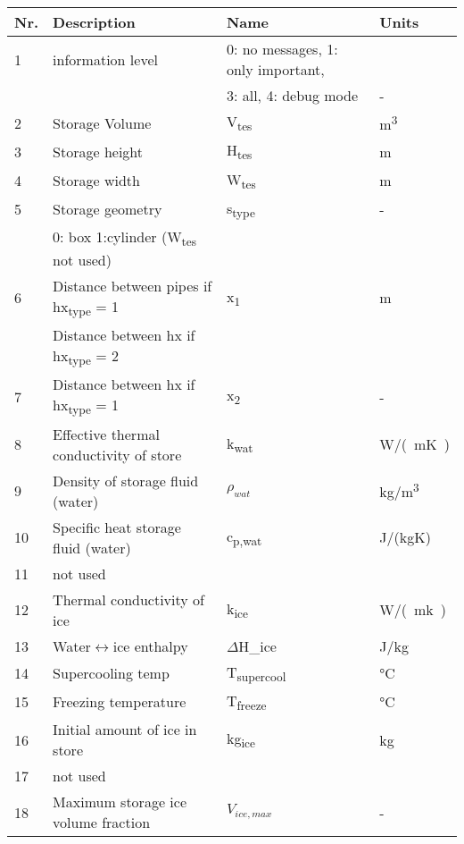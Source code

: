 \documentclass[english]{SPFReport}
\begin{document}
\def\arraystretch{1.3}
\begin{tabular}{| l |  m{8cm} | l | l |}


\hline
\textbf{Nr.} & \textbf{Description} & \textbf{Name}& \textbf{Units} \\
\hline

 1 & information level &  0: no messages, 1: only important,&  \\
 & & 3: all, 4: debug mode& -  \\
  2 & Storage Volume & \si{V_{tes}} & \si{m^3}  \\
  3 & Storage height & \si{H_{tes}} & m  \\
  4 & Storage width & \si{W_{tes}} & m  \\
  5 & Storage geometry & \si{s_{type}} & - \\    
     &   0: box 1:cylinder (\si{W_{tes}} not used) &&\\
  6 & Distance between pipes if \si{hx_{type}} = 1 & \si{x_1} & m \\
     & Distance between hx if \si{hx_{type}} = 2 & & \\
  7 & Distance between hx if \si{hx_{type}} = 1 & \si{x_2} & -  \\
  8 & Effective thermal conductivity of store & \si{k_{wat}} & \si{W/(mK)}  \\
  9 & Density of storage fluid (water) & \si{$\rho_{wat}$} & \si{kg/m^3}  \\
  10 & Specific heat storage fluid (water) & \si{c_{p,wat}} & J/(kgK) \\
11 &not used &  &  \\
  12 & Thermal conductivity of ice & \si{k_{ice}} & \si{W/(mk)}  \\
  13 & Water$\leftrightarrow$ice enthalpy & \si{$\Delta$H_{ice}} &        \si{J/kg}  \\
  14 & Supercooling temp & \si{T_{supercool}} & \si{\degreeCelsius} \\
  15 & Freezing temperature & \si{T_{freeze}} &\si{\degreeCelsius} \\
  16 & Initial amount of ice in store & \si{kg_{ice}} & kg \\
17 & not used & & \\
  18 & Maximum storage ice volume fraction & \si{$V_{ice,max}$} & - \\

\end{tabular}
\end{document}
